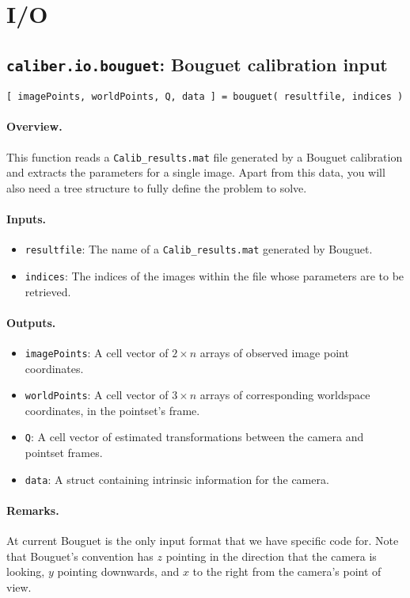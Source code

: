 \section{I/O}

\subsection{\texttt{caliber.io.bouguet}: Bouguet calibration input}
\texttt{[ imagePoints, worldPoints, Q, data ] = bouguet( resultfile, indices )}
\paragraph{Overview.} This function reads a \texttt{Calib\_results.mat} file generated
by a Bouguet calibration and extracts the parameters for a single image.
Apart from this data, you will also need a tree structure to fully define the problem
to solve.
\paragraph{Inputs.}
\begin{itemize}
	\item \texttt{resultfile}: The name of a \texttt{Calib\_results.mat} generated
		by Bouguet.
	\item \texttt{indices}: The indices of the images within the file whose parameters are
		to be retrieved.
\end{itemize}
\paragraph{Outputs.}
\begin{itemize}
	\item \texttt{imagePoints}: A cell vector of $2 \times n$ arrays of observed image point coordinates.
	\item \texttt{worldPoints}: A cell vector of $3 \times n$ arrays of corresponding worldspace coordinates,
		in the pointset's frame.
	\item \texttt{Q}: A cell vector of estimated transformations between the camera and pointset frames.
    \item \texttt{data}: A struct containing intrinsic information for the camera.
\end{itemize}
\paragraph{Remarks.} 
	At current Bouguet is the only input format that we have specific code for.
	Note that Bouguet's convention has $z$ pointing in the direction that 
	the camera is looking, $y$ pointing downwards, and $x$ to the right from the
	camera's point of view.